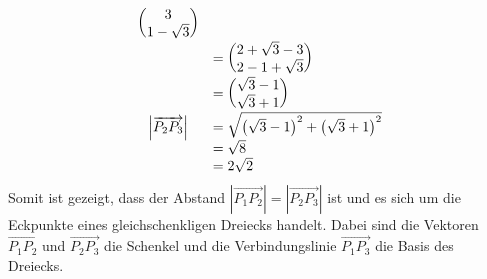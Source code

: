 \begin{gather*}
\begin{array}{ c l }
\begin{pmatrix}
      3\\
      1-\sqrt{3}
    \end{pmatrix}\\
    & =\begin{pmatrix}
      2+\sqrt{3} -3\\
      2-1+\sqrt{3}
    \end{pmatrix}\\
    & =\begin{pmatrix}
      \sqrt{3} -1\\
      \sqrt{3} +1
    \end{pmatrix}\\
    \left| \overrightarrow{P_{2} P_{3}}\right|  & =\sqrt{\left(\sqrt{3} -1\right)^{2} +\left(\sqrt{3} +1\right)^{2}}\\
    & =\sqrt{8}\\
    & =2\sqrt{2}
  \end{array}
\end{gather*}
Somit ist gezeigt, dass der Abstand $\displaystyle \left| \overrightarrow{P_{1} P_{2}}\right| =\left| \overrightarrow{P_{2} P_{3}}\right| $ ist und es sich um die Eckpunkte eines gleichschenkligen Dreiecks handelt. Dabei sind die Vektoren $\displaystyle \overrightarrow{P_{1} P_{2}}$ und $\displaystyle \overrightarrow{P_{2} P_{3}}$ die Schenkel und die Verbindungslinie $\displaystyle \overrightarrow{P_{1} P_{3}}$ die Basis des Dreiecks.



